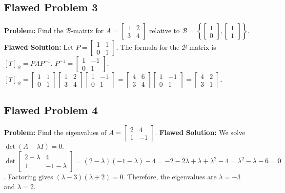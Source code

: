 \documentclass[11pt, a4paper]{article}
\theoremstyle{definition}
\theoremstyle{remark}
\begin{document}
\subsection{Flawed Problem 3}
\textbf{Problem:} Find the $\mathcal{B}$-matrix for $A = \begin{bmatrix} 1 & 2 \\ 3 & 4 \end{bmatrix}$ relative to $\mathcal{B} = \left\{ \begin{bmatrix} 1 \\ 0 \end{bmatrix}, \begin{bmatrix} 1 \\ 1 \end{bmatrix} \right\}$.
\textbf{Flawed Solution:}
Let $P = \begin{bmatrix} 1 & 1 \\ 0 & 1 \end{bmatrix}$. The formula for the $\mathcal{B}$-matrix is $[T]_\mathcal{B} = PAP^{-1}$.
$P^{-1} = \begin{bmatrix} 1 & -1 \\ 0 & 1 \end{bmatrix}$.
$[T]_\mathcal{B} = \begin{bmatrix} 1 & 1 \\ 0 & 1 \end{bmatrix} \begin{bmatrix} 1 & 2 \\ 3 & 4 \end{bmatrix} \begin{bmatrix} 1 & -1 \\ 0 & 1 \end{bmatrix} = \begin{bmatrix} 4 & 6 \\ 3 & 4 \end{bmatrix} \begin{bmatrix} 1 & -1 \\ 0 & 1 \end{bmatrix} = \begin{bmatrix} 4 & 2 \\ 3 & 1 \end{bmatrix}$.

\subsection{Flawed Problem 4}
\textbf{Problem:} Find the eigenvalues of $A = \begin{bmatrix} 2 & 4 \\ 1 & -1 \end{bmatrix}$.
\textbf{Flawed Solution:}
We solve $\det(A - \lambda I) = 0$.
$\det \begin{bmatrix} 2-\lambda & 4 \\ 1 & -1-\lambda \end{bmatrix} = (2-\lambda)(-1-\lambda) - 4 = -2 - 2\lambda + \lambda + \lambda^2 - 4 = \lambda^2 - \lambda - 6 = 0$.
Factoring gives $(\lambda - 3)(\lambda + 2) = 0$.
Therefore, the eigenvalues are $\lambda = -3$ and $\lambda = 2$.
\end{document}
